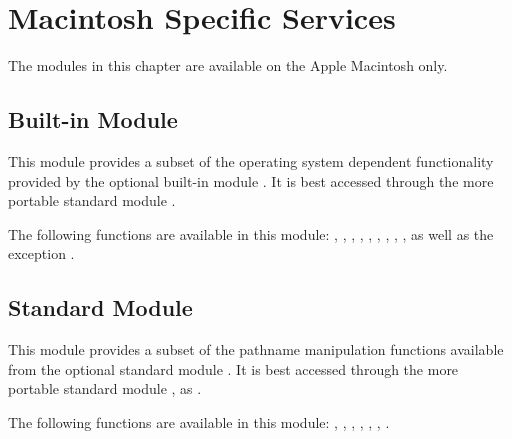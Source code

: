 \chapter{Macintosh Specific Services}

The modules in this chapter are available on the Apple Macintosh only.

\section{Built-in Module }

This module provides a subset of the operating system dependent
functionality provided by the optional built-in module .
It is best accessed through the more portable standard module
.

The following functions are available in this module:
,
,
,
,
,
,
,
,
,
as well as the exception .

\section{Standard Module }

This module provides a subset of the pathname manipulation functions
available from the optional standard module .  It is
best accessed through the more portable standard module , as
.

The following functions are available in this module:
,
,
,
,
,
,
.
